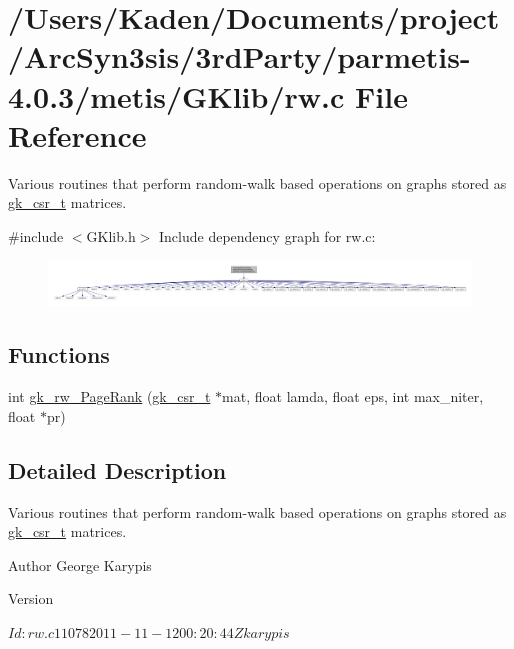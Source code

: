 \hypertarget{a00134}{}\section{/\+Users/\+Kaden/\+Documents/project/\+Arc\+Syn3sis/3rd\+Party/parmetis-\/4.0.3/metis/\+G\+Klib/rw.c File Reference}
\label{a00134}


Various routines that perform random-\/walk based operations on graphs stored as \hyperlink{a00634}{gk\+\_\+csr\+\_\+t} matrices.  


{\ttfamily \#include $<$G\+Klib.\+h$>$}\newline
Include dependency graph for rw.\+c\+:\nopagebreak
\begin{figure}[H]
\begin{center}
\leavevmode
\includegraphics[width=350pt]{a00135}
\end{center}
\end{figure}
\subsection*{Functions}
\begin{DoxyCompactItemize}
\item 
int \hyperlink{a00134_a5f79542ae883d026565a71bab5bca8d4}{gk\+\_\+rw\+\_\+\+Page\+Rank} (\hyperlink{a00634}{gk\+\_\+csr\+\_\+t} $\ast$mat, float lamda, float eps, int max\+\_\+niter, float $\ast$pr)
\end{DoxyCompactItemize}


\subsection{Detailed Description}
Various routines that perform random-\/walk based operations on graphs stored as \hyperlink{a00634}{gk\+\_\+csr\+\_\+t} matrices. 

\begin{DoxyAuthor}{Author}
George Karypis 
\end{DoxyAuthor}
\begin{DoxyVersion}{Version}
\begin{DoxyVerb}$Id: rw.c 11078 2011-11-12 00:20:44Z karypis $ \end{DoxyVerb}
 
\end{DoxyVersion}


